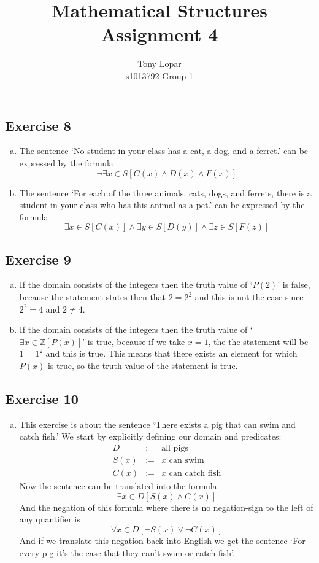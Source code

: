 \documentclass[a4paper]{article}
\title{Mathematical Structures\\Assignment 4}
\author{Tony Lopar \\ s1013792 \quad Group 1}
\newcommand{\exerciseenum}[2]{\subsection*{Exercise #1}{\begin{enumerate}[a)]#2\end{enumerate}}}
\newcommand{\ZZ}{\ensuremath{\mathbb{Z}}}
\begin{document}
\maketitle


\exerciseenum{8}{%
\addtocounter{enumi}{3}
\item%
The sentence
`No student in your class has a cat, a dog, and a ferret.'
can be expressed by the formula
\[\neg \exists x \in S[C(x) \land D(x) \land F(x)]\]
\item%
The sentence
`For each of the three animals, cats, dogs, and ferrets,
    there is a student in your class who has this animal as
    a pet.'
can be expressed by the formula
\[\exists x \in S[C(x)] \land \exists y \in S[D(y)] \land \exists z \in S[F(z)]\]
}

\exerciseenum{9}{%
\addtocounter{enumi}{2}
\item%
If the domain consists of the integers then the truth value of
`$P(2)$'
is false,
because the statement states then that $2 = 2^2$ and this is not the case since $2^2 = 4$ and $2 \neq 4$.
\addtocounter{enumi}{1}
\item%
If the domain consists of the integers then the truth value of
`$\exists x\in \ZZ \left[ P(x) \right]$'
is true,
because if we take $x = 1$, the the statement will be $1 = 1^2$ and this is true. This means that there exists an element for which $P(x)$ is true, so the truth value of the statement is true.
}

\exerciseenum{10}{%
\addtocounter{enumi}{4}
\item%
This exercise is about the sentence
`There exists a pig that can swim and catch fish.'
We start by explicitly defining our domain and predicates:
\begin{eqnarray*}
D    &:= & \mbox{all pigs}\\
S(x) &:= & \mbox{$x$ can swim}\\
C(x) &:= & \mbox{$x$ can catch fish}
\end{eqnarray*}
Now the sentence can be translated into the formula:
\[\exists x \in D[S(x) \land C(x)]\]
And the negation of this formula where there is no negation-sign to the left
of any quantifier is
\[\forall x \in D[\neg S(x) \lor \neg C(x)]\]
And if we translate this negation back into English we get the sentence
`For every pig it's the case that they can't swim or catch fish'.
}
\end{document}
